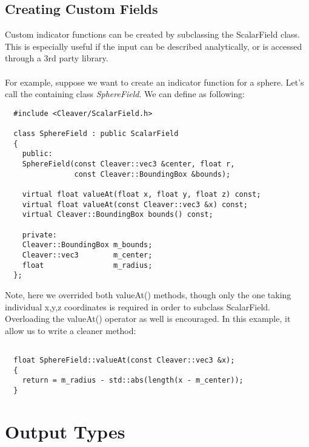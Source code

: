 \documentclass[fleqn,12pt,openany]{book}
\begin{document}
\subsection{Creating Custom Fields}

Custom indicator functions can be created by subclassing the ScalarField 
class. This is especially useful if the input can be described analytically, 
or is accessed through a 3rd party library.

\paragraph{}
For example, suppose we want to create an indicator function for a sphere.
Let's call the containing class \emph{SphereField}. We can define as following:

\begin{verbatim}
  #include <Cleaver/ScalarField.h>    

  class SphereField : public ScalarField
  {
    public:
    SphereField(const Cleaver::vec3 &center, float r,
                const Cleaver::BoundingBox &bounds);

    virtual float valueAt(float x, float y, float z) const;
    virtual float valueAt(const Cleaver::vec3 &x) const;
    virtual Cleaver::BoundingBox bounds() const;

    private:
    Cleaver::BoundingBox m_bounds;
    Cleaver::vec3        m_center;
    float                m_radius;
  };
\end{verbatim}

Note, here we overrided both valueAt() methods, though only the one taking
individual x,y,z coordinates is required in order to subclass ScalarField.
Overloading the valueAt() operator as well is encouraged. In this example,
it allow us to write a cleaner method:

\begin{verbatim}

  float SphereField::valueAt(const Cleaver::vec3 &x);
  {
    return = m_radius - std::abs(length(x - m_center));
  }
\end{verbatim}

\newpage

\section{Output Types}
\end{document}
